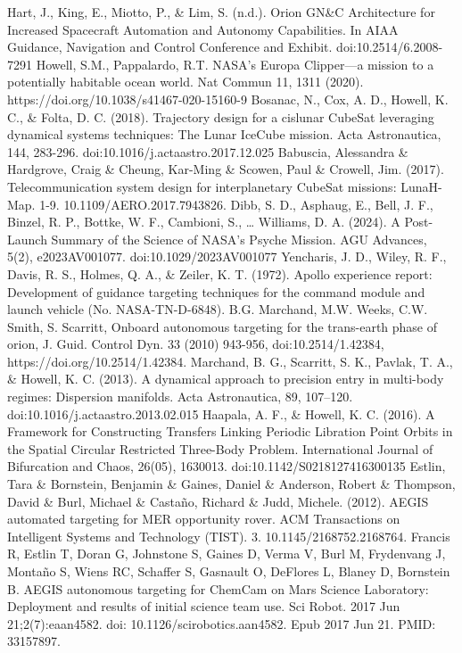 \documentclass[conference]{IEEEtran}
\begin{document}
\begin{thebibliography}{00}

 Hart, J., King, E., Miotto, P., \& Lim, S. (n.d.). Orion GN\&C Architecture for Increased Spacecraft Automation and Autonomy Capabilities. In AIAA Guidance, Navigation and Control Conference and Exhibit. doi:10.2514/6.2008-7291
 Howell, S.M., Pappalardo, R.T. NASA's Europa Clipper—a mission to a potentially habitable ocean world. Nat Commun 11, 1311 (2020). https://doi.org/10.1038/s41467-020-15160-9
 Bosanac, N., Cox, A. D., Howell, K. C., \& Folta, D. C. (2018). Trajectory design for a cislunar CubeSat leveraging dynamical systems techniques: The Lunar IceCube mission. Acta Astronautica, 144, 283-296. doi:10.1016/j.actaastro.2017.12.025
 Babuscia, Alessandra \& Hardgrove, Craig \& Cheung, Kar-Ming \& Scowen, Paul \& Crowell, Jim. (2017). Telecommunication system design for interplanetary CubeSat missions: LunaH-Map. 1-9. 10.1109/AERO.2017.7943826.
 Dibb, S. D., Asphaug, E., Bell, J. F., Binzel, R. P., Bottke, W. F., Cambioni, S., … Williams, D. A. (2024). A Post-Launch Summary of the Science of NASA's Psyche Mission. AGU Advances, 5(2), e2023AV001077. doi:10.1029/2023AV001077
 Yencharis, J. D., Wiley, R. F., Davis, R. S., Holmes, Q. A., \& Zeiler, K. T. (1972). Apollo experience report: Development of guidance targeting techniques for the command module and launch vehicle (No. NASA-TN-D-6848).
 B.G. Marchand, M.W. Weeks, C.W. Smith, S. Scarritt, Onboard autonomous targeting for the trans-earth phase of orion, J. Guid. Control Dyn. 33 (2010) 943-956, doi:10.2514/1.42384, https://doi.org/10.2514/1.42384.
 Marchand, B. G., Scarritt, S. K., Pavlak, T. A., \& Howell, K. C. (2013). A dynamical approach to precision entry in multi-body regimes: Dispersion manifolds. Acta Astronautica, 89, 107–120. doi:10.1016/j.actaastro.2013.02.015
 Haapala, A. F., \& Howell, K. C. (2016). A Framework for Constructing Transfers Linking Periodic Libration Point Orbits in the Spatial Circular Restricted Three-Body Problem. International Journal of Bifurcation and Chaos, 26(05), 1630013. doi:10.1142/S0218127416300135
 Estlin, Tara \& Bornstein, Benjamin \& Gaines, Daniel \& Anderson, Robert \& Thompson, David \& Burl, Michael \& Castaño, Richard \& Judd, Michele. (2012). AEGIS automated targeting for MER opportunity rover. ACM Transactions on Intelligent Systems and Technology (TIST). 3. 10.1145/2168752.2168764.
 Francis R, Estlin T, Doran G, Johnstone S, Gaines D, Verma V, Burl M, Frydenvang J, Montaño S, Wiens RC, Schaffer S, Gasnault O, DeFlores L, Blaney D, Bornstein B. AEGIS autonomous targeting for ChemCam on Mars Science Laboratory: Deployment and results of initial science team use. Sci Robot. 2017 Jun 21;2(7):eaan4582. doi: 10.1126/scirobotics.aan4582. Epub 2017 Jun 21. PMID: 33157897.

\end{thebibliography}
\end{document}
